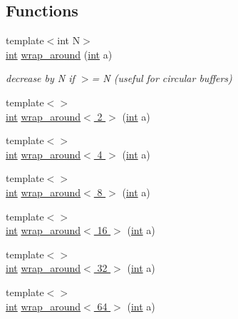 \subsection*{Functions}
\begin{DoxyCompactItemize}
\item 
{\footnotesize template$<$int N$>$ }\\\hyperlink{tk_8h_a83f82f76e7fed06f4c49d2db94028a6d}{int} \hyperlink{namespacedsp_a7449afa1cea11ce3b972f3f9fa107b99}{wrap\+\_\+around} (\hyperlink{tk_8h_a83f82f76e7fed06f4c49d2db94028a6d}{int} a)
\begin{DoxyCompactList}\small\item\em decrease by N if $>$= N (useful for circular buffers) \end{DoxyCompactList}\item 
{\footnotesize template$<$$>$ }\\\hyperlink{tk_8h_a83f82f76e7fed06f4c49d2db94028a6d}{int} \hyperlink{namespacedsp_afffde31b63a42b9b1132b45196dd1e89}{wrap\+\_\+around$<$ 2 $>$} (\hyperlink{tk_8h_a83f82f76e7fed06f4c49d2db94028a6d}{int} a)
\item 
{\footnotesize template$<$$>$ }\\\hyperlink{tk_8h_a83f82f76e7fed06f4c49d2db94028a6d}{int} \hyperlink{namespacedsp_a538a801d8b57010e71956d8bde2e791b}{wrap\+\_\+around$<$ 4 $>$} (\hyperlink{tk_8h_a83f82f76e7fed06f4c49d2db94028a6d}{int} a)
\item 
{\footnotesize template$<$$>$ }\\\hyperlink{tk_8h_a83f82f76e7fed06f4c49d2db94028a6d}{int} \hyperlink{namespacedsp_a8ea22ff9da95484783f6b5223300f29c}{wrap\+\_\+around$<$ 8 $>$} (\hyperlink{tk_8h_a83f82f76e7fed06f4c49d2db94028a6d}{int} a)
\item 
{\footnotesize template$<$$>$ }\\\hyperlink{tk_8h_a83f82f76e7fed06f4c49d2db94028a6d}{int} \hyperlink{namespacedsp_a0ba3a2b3953279ca422baf133bbe5311}{wrap\+\_\+around$<$ 16 $>$} (\hyperlink{tk_8h_a83f82f76e7fed06f4c49d2db94028a6d}{int} a)
\item 
{\footnotesize template$<$$>$ }\\\hyperlink{tk_8h_a83f82f76e7fed06f4c49d2db94028a6d}{int} \hyperlink{namespacedsp_af38eb85e16f50d0326ac58c4cf19e940}{wrap\+\_\+around$<$ 32 $>$} (\hyperlink{tk_8h_a83f82f76e7fed06f4c49d2db94028a6d}{int} a)
\item 
{\footnotesize template$<$$>$ }\\\hyperlink{tk_8h_a83f82f76e7fed06f4c49d2db94028a6d}{int} \hyperlink{namespacedsp_acb589cce928a12a974b21d1faa829b74}{wrap\+\_\+around$<$ 64 $>$} (\hyperlink{tk_8h_a83f82f76e7fed06f4c49d2db94028a6d}{int} a)

\end{DoxyCompactItemize}
